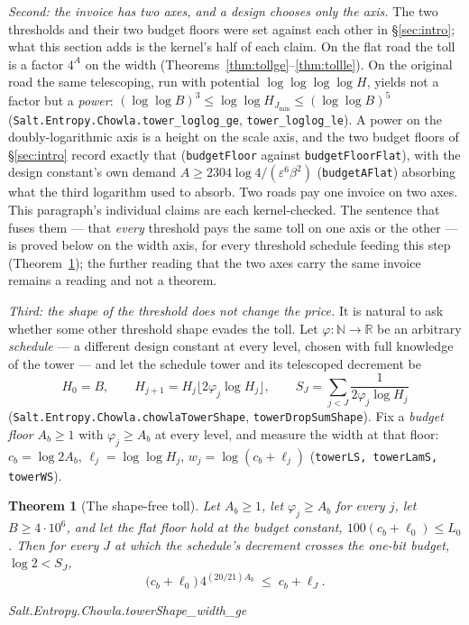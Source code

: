 \documentclass[11pt]{amsart}
\newcommand{\leanname}[1]{\par{\noindent\small\ttfamily\raggedright #1\par}}
\newcommand{\leaninline}[1]{{\small\texttt{#1}}}
\newtheorem{theorem}{Theorem}[section]
\theoremstyle{remark}
\begin{document}
\emph{Second: the invoice has two axes, and a design chooses only the
axis.} The two thresholds and their two budget floors were set against
each other in \S\ref{sec:intro}; what this section adds is the kernel's
half of each claim. On the flat road the toll is a factor $4^{A}$ on the
width (Theorems~\ref{thm:tollge}--\ref{thm:tollle}). On the original
road the same telescoping, run with potential $\log\log\log\log H$,
yields not a factor but a \emph{power}:
$(\log\log B)^{3} \le \log\log H_{J_{\min}} \le (\log\log B)^{5}$
(\leaninline{Salt.Entropy.Chowla.tower\_loglog\_ge},
\leaninline{tower\_loglog\_le}). A power on the doubly-logarithmic axis
is a height on the scale axis, and the two budget floors of
\S\ref{sec:intro} record exactly that
(\leaninline{budgetFloor} against \leaninline{budgetFloorFlat}), with
the design constant's own demand
$A \ge 2304\log 4/(\varepsilon^{6}\beta^{2})$
(\leaninline{budgetAFlat}) absorbing what the third logarithm used to
absorb. Two roads pay one invoice on two axes. This paragraph's individual
claims are each kernel-checked. The sentence that fuses them --- that
\emph{every} threshold pays the same toll on one axis or the other --- is
proved below on the width axis, for every threshold schedule feeding this
step (Theorem~\ref{thm:shapetoll}); the further reading that the two axes
carry the same invoice remains a reading and not a theorem.

\emph{Third: the shape of the threshold does not change the price.} It is
natural to ask whether some other threshold shape evades the toll. Let
$\varphi : \mathbb{N} \to \mathbb{R}$ be an arbitrary \emph{schedule} --- a
different design constant at every level, chosen with full knowledge of the
tower --- and let the schedule tower and its telescoped decrement be
\[
H_0 = B, \qquad H_{j+1} = H_j\bigl\lfloor 2\varphi_j \log H_j\bigr\rfloor,
\qquad
S_J = \sum_{j<J} \frac{1}{2\varphi_j \log H_j}
\]
(\leaninline{Salt.Entropy.Chowla.chowlaTowerShape},
\leaninline{towerDropSumShape}). Fix a \emph{budget floor} $A_b \ge 1$ with
$\varphi_j \ge A_b$ at every level, and measure the width at that floor:
$c_b = \log 2A_b$, $\ell_j = \log\log H_j$, $w_j = \log(c_b+\ell_j)$
(\leaninline{towerLS, towerLamS, towerWS}).

\begin{theorem}[The shape-free toll]\label{thm:shapetoll}
Let $A_b \ge 1$, let $\varphi_j \ge A_b$ for every $j$, let
$B \ge 4\cdot10^{6}$, and let the flat floor hold at the budget constant,
$100(c_b + \ell_0) \le L_0$. Then for \emph{every} $J$ at which the
schedule's decrement crosses the one-bit budget, $\log 2 < S_J$,
\[
\bigl(c_b + \ell_0\bigr)\,4^{(20/21)A_b} \;\le\; c_b + \ell_J .
\]
\leanname{Salt.Entropy.Chowla.towerShape\_width\_ge}
\end{theorem}
\end{document}
